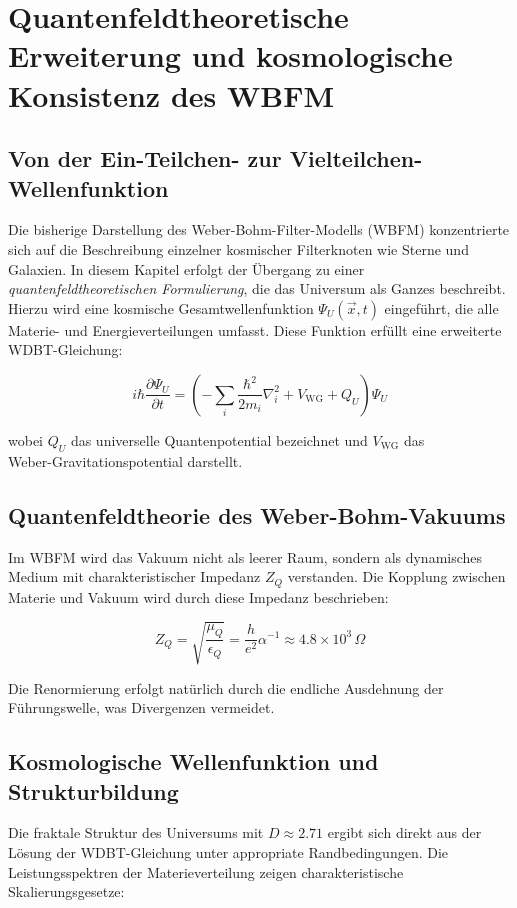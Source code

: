 \chapter{Quantenfeldtheoretische Erweiterung und kosmologische Konsistenz des WBFM}

\section{Von der Ein-Teilchen- zur Vielteilchen-Wellenfunktion}

Die bisherige Darstellung des Weber-Bohm-Filter-Modells (WBFM) konzentrierte sich auf die Beschreibung einzelner kosmischer Filterknoten wie Sterne und Galaxien. In diesem Kapitel erfolgt der Übergang zu einer \textit{quantenfeldtheoretischen Formulierung}, die das Universum als Ganzes beschreibt. Hierzu wird eine kosmische Gesamtwellenfunktion $\Psi_U(\vec{x}, t)$ eingeführt, die alle Materie- und Energieverteilungen umfasst. Diese Funktion erfüllt eine erweiterte WDBT-Gleichung:

\[
i\hbar \frac{\partial \Psi_U}{\partial t} = \left( -\sum_i \frac{\hbar^2}{2m_i} \nabla_i^2 + V_{\text{WG}} + Q_U \right) \Psi_U
\]

wobei $Q_U$ das universelle Quantenpotential bezeichnet und $V_{\text{WG}}$ das\\Weber-Gravitationspotential darstellt.

\section{Quantenfeldtheorie des Weber-Bohm-Vakuums}

Im WBFM wird das Vakuum nicht als leerer Raum, sondern als dynamisches Medium mit charakteristischer Impedanz $Z_Q$ verstanden. Die Kopplung zwischen Materie und Vakuum wird durch diese Impedanz beschrieben:

\[
Z_Q = \sqrt{\frac{\mu_Q}{\epsilon_Q}} = \frac{h}{e^2} \alpha^{-1} \approx 4.8 \times 10^3 \, \Omega
\]

Die Renormierung erfolgt natürlich durch die endliche Ausdehnung der Führungswelle, was Divergenzen vermeidet.

\section{Kosmologische Wellenfunktion und Strukturbildung}

Die fraktale Struktur des Universums mit $D \approx 2.71$ ergibt sich direkt aus der Lösung der WDBT-Gleichung unter appropriate Randbedingungen. Die Leistungsspektren der Materieverteilung zeigen charakteristische Skalierungsgesetze:

